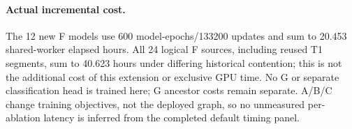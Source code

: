\paragraph{Actual incremental cost.} The 12 new F models use 600 model-epochs/133200 updates and sum to 20.453 shared-worker elapsed hours. All 24 logical F sources, including reused T1 segments, sum to 40.623 hours under differing historical contention; this is not the additional cost of this extension or exclusive GPU time. No G or separate classification head is trained here; G ancestor costs remain separate. A/B/C change training objectives, not the deployed graph, so no unmeasured per-ablation latency is inferred from the completed default timing panel.
